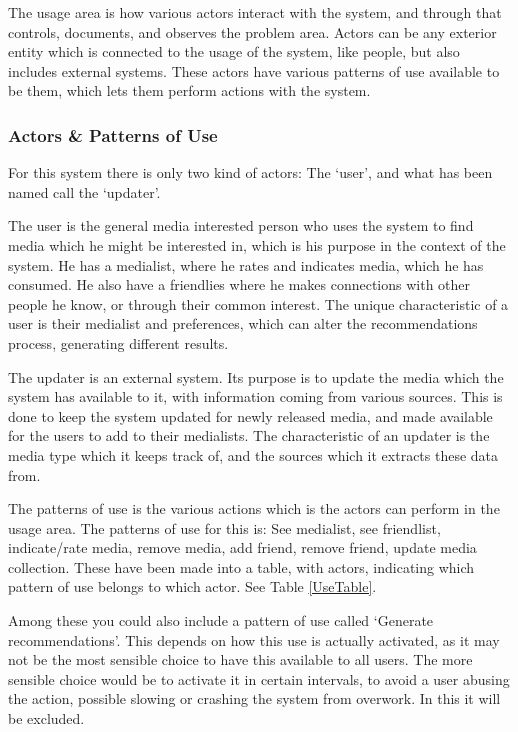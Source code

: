 The usage area is how various actors interact with the system, and through that controls, documents, and observes the problem area. Actors can be any exterior entity which is connected to the usage of the system, like people, but also includes external systems. These actors have various patterns of use available to be them, which lets them perform actions with the system.

\subsubsection{Actors \& Patterns of Use}

For this system there is only two kind of actors: The ‘user’, and what has been named call the ‘updater’.

The user is the general media interested person who uses the system to find media which he might be interested in, which is his purpose in the context of the system. He has a medialist, where he rates and indicates media, which he has consumed. He also have a friendlies where he makes connections with other people he know, or through their common interest. The unique characteristic of a user is their medialist and preferences, which can alter the recommendations process, generating different results.

The updater is an external system. Its purpose is to update the media which the system has available to it, with information coming from various sources. This is done to keep the system updated for newly released media, and made available for the users to add to their medialists. The characteristic of an updater is the media type which it keeps track of, and the sources which it extracts these data from.

The patterns of use is the various actions which is the actors can perform in the usage area. The patterns of use for this is: See medialist, see friendlist, indicate/rate media, remove media, add friend, remove friend, update media collection. These have been made into a table, with actors, indicating which pattern of use belongs to which actor. See Table \ref{UseTable}.

Among these you could also include a pattern of use called ‘Generate recommendations’. This depends on how this use is actually activated, as it may not be the most sensible choice to have this available to all users. The more sensible choice would be to activate it in certain intervals, to avoid a user abusing the action, possible slowing or crashing the system from overwork. In this it will be excluded.

